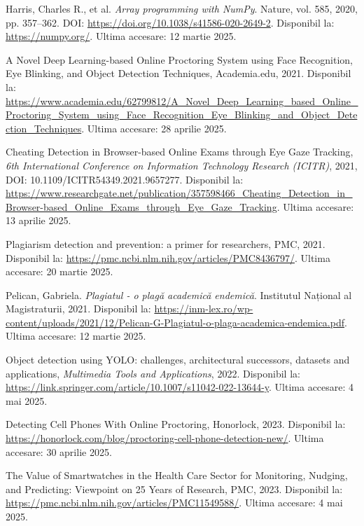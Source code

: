 \documentclass[12pt,a4paper]{article}
\begin{document}
\begin{thebibliography}{9}
Harris, Charles R., et al. 
\textit{Array programming with NumPy}. 
Nature, vol. 585, 2020, pp. 357–362. 
DOI: \url{https://doi.org/10.1038/s41586-020-2649-2}. 
Disponibil la: \url{https://numpy.org/}. 
Ultima accesare: 12 martie 2025.

A Novel Deep Learning-based Online Proctoring System using Face Recognition, Eye Blinking, and Object Detection Techniques,
Academia.edu,
2021.
Disponibil la: \url{https://www.academia.edu/62799812/A_Novel_Deep_Learning_based_Online_Proctoring_System_using_Face_Recognition_Eye_Blinking_and_Object_Detection_Techniques}.
Ultima accesare: 28 aprilie 2025.

Cheating Detection in Browser-based Online Exams through Eye Gaze Tracking,
\textit{6th International Conference on Information Technology Research (ICITR)},
2021,
DOI: 10.1109/ICITR54349.2021.9657277.
Disponibil la: \url{https://www.researchgate.net/publication/357598466_Cheating_Detection_in_Browser-based_Online_Exams_through_Eye_Gaze_Tracking}.
Ultima accesare: 13 aprilie 2025.

Plagiarism detection and prevention: a primer for researchers,
PMC,
2021.
Disponibil la: \url{https://pmc.ncbi.nlm.nih.gov/articles/PMC8436797/}.
Ultima accesare: 20 martie 2025.

Pelican, Gabriela. 
\textit{Plagiatul - o plagă academică endemică}. 
Institutul Național al Magistraturii, 2021. 
Disponibil la: \url{https://inm-lex.ro/wp-content/uploads/2021/12/Pelican-G-Plagiatul-o-plaga-academica-endemica.pdf}. 
Ultima accesare: 12 martie 2025.

Object detection using YOLO: challenges, architectural successors, datasets and applications,
\textit{Multimedia Tools and Applications},
2022.
Disponibil la: \url{https://link.springer.com/article/10.1007/s11042-022-13644-y}.
Ultima accesare: 4 mai 2025.

Detecting Cell Phones With Online Proctoring,
Honorlock,
2023.
Disponibil la: \url{https://honorlock.com/blog/proctoring-cell-phone-detection-new/}.
Ultima accesare: 30 aprilie 2025.

The Value of Smartwatches in the Health Care Sector for Monitoring, Nudging, and Predicting: Viewpoint on 25 Years of Research,
PMC,
2023.
Disponibil la: \url{https://pmc.ncbi.nlm.nih.gov/articles/PMC11549588/}.
Ultima accesare: 4 mai 2025.


\end{thebibliography}
\end{document}
